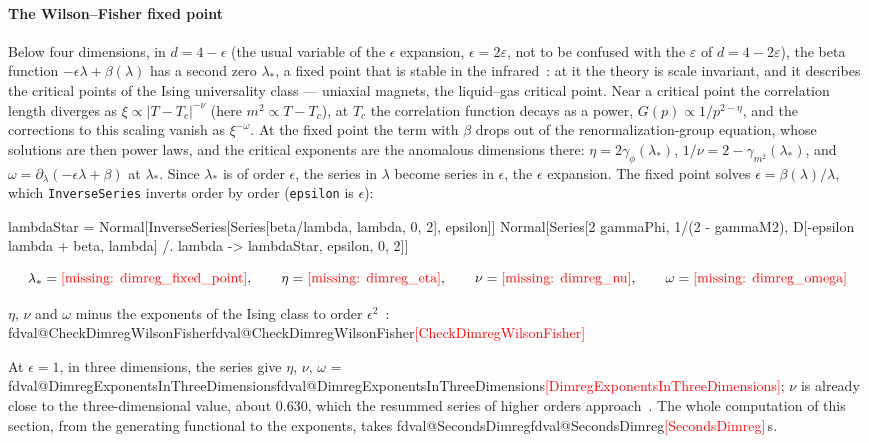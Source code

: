 \documentclass[11pt,a4paper]{article}
\makeatletter
\newcommand{\formula}[1]{\IfFileExists{figures/formula_#1.tex}{}{\text{\textcolor{red}{[missing: \detokenize{#1}]}}}}
\newcommand{\pkg}[1]{\texttt{#1}}
\newcommand{\val}[1]{\ifcsname fdval@#1\endcsname\csname fdval@#1\endcsname\else\textcolor{red}{[#1]}\fi}
\makeatother
\begin{document}
\paragraph{The Wilson--Fisher fixed point} Below four dimensions, in $d=4-\epsilon$ (the usual variable of the $\epsilon$ expansion, $\epsilon=2\varepsilon$, not
to be confused with the $\varepsilon$ of $d=4-2\varepsilon$), the beta function
$-\epsilon\lambda+\beta(\lambda)$ has a second zero $\lambda_*$, a fixed point that is stable in the
infrared~\cite{WilsonFisher1972}: at it the theory is scale invariant, and it describes the critical points of the Ising
universality class --- uniaxial magnets, the liquid--gas critical point. Near a critical point the correlation length
diverges as $\xi\propto|T-T_c|^{-\nu}$ (here $m^2\propto T-T_c$), at $T_c$ the correlation function decays as a power,
$G(p)\propto1/p^{2-\eta}$, and the corrections to this scaling vanish as $\xi^{-\omega}$. At the fixed point the term with
$\beta$ drops out of the renormalization-group equation, whose solutions are then power laws, and the critical exponents
are the anomalous dimensions there: $\eta=2\gamma_\phi(\lambda_*)$, $1/\nu=2-\gamma_{m^2}(\lambda_*)$, and
$\omega=\partial_\lambda(-\epsilon\lambda+\beta)$ at $\lambda_*$. Since $\lambda_*$ is of order $\epsilon$, the series in
$\lambda$ become series in $\epsilon$, the $\epsilon$ expansion. The fixed point solves $\epsilon=\beta(\lambda)/\lambda$, which
\pkg{InverseSeries} inverts order by order (\pkg{epsilon} is $\epsilon$):
\begin{code}
lambdaStar = Normal[InverseSeries[Series[beta/lambda, {lambda, 0, 2}],
    epsilon]]
Normal[Series[{2 gammaPhi, 1/(2 - gammaM2), D[-epsilon lambda + beta, lambda]} /.
    lambda -> lambdaStar, {epsilon, 0, 2}]]
\end{code}
\begin{outputbox}
\vspace{-6pt}
\[
\lambda_*=\formula{dimreg_fixed_point},\qquad \eta=\formula{dimreg_eta},\qquad \nu=\formula{dimreg_nu},\qquad
\omega=\formula{dimreg_omega}
\]
\end{outputbox}
\begin{result}
$\eta$, $\nu$ and $\omega$ minus the exponents of the Ising class to order $\epsilon^2$~\cite{ZinnJustin2002,KleinertSchulteFrohlinde2001}:
\val{CheckDimregWilsonFisher}
\end{result}
At $\epsilon=1$, in three dimensions, the series give $\eta$, $\nu$, $\omega$ = \val{DimregExponentsInThreeDimensions};
$\nu$ is already close to the three-dimensional value, about $0.630$, which the resummed series of higher orders
approach~\cite{ZinnJustin2002,KleinertSchulteFrohlinde2001}. The whole computation of this section, from the generating
functional to the exponents, takes \val{SecondsDimreg}\,s.
\end{document}
